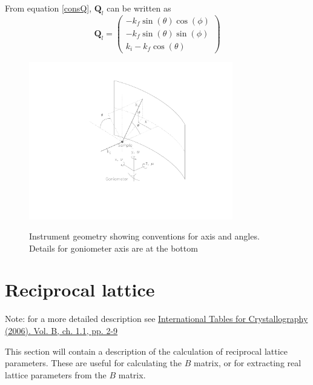\documentclass[prb]{revtex4}%
\begin{document}
From equation \ref{consQ}, $\textbf{Q}_l$ can be written as
\begin{equation}\label{Qlab}
\textbf{Q}_l = \left(\begin{array}{c}
                                                            -k_f\sin(\theta)\cos(\phi) \\
                                                            -k_f\sin(\theta)\sin(\phi) \\
                                                            k_i-k_f\cos(\theta)
                                                          \end{array}\right)
\end{equation}
\begin{figure}[hb]
  \includegraphics[width=3.5in]{UBmatriximplementationnotes_fig1.pdf}\\
  \caption{Instrument geometry showing conventions for axis and angles.
  Details for goniometer axis are at the bottom}\label{instgeom}
\end{figure}


\section{Reciprocal lattice}

Note: for a more detailed description see \href{http://it.iucr.org/Ba/ch1o1v0001/}{International Tables for Crystallography (2006). Vol. B, ch. 1.1, pp. 2-9 }

This section will contain a description of the calculation of reciprocal lattice parameters. These are useful for
calculating the $B$ matrix, or for extracting real lattice parameters from the $B$ matrix.
\end{document}
